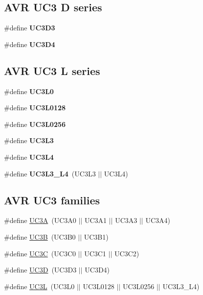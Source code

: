 \subsection*{A\-V\-R U\-C3 D series}
\begin{DoxyCompactItemize}
\item 
\#define {\bfseries U\-C3\-D3}
\item 
\#define {\bfseries U\-C3\-D4}
\end{DoxyCompactItemize}
\subsection*{A\-V\-R U\-C3 L series}
\begin{DoxyCompactItemize}
\item 
\#define {\bfseries U\-C3\-L0}
\item 
\#define {\bfseries U\-C3\-L0128}
\item 
\#define {\bfseries U\-C3\-L0256}
\item 
\#define {\bfseries U\-C3\-L3}
\item 
\#define {\bfseries U\-C3\-L4}
\item 
\hypertarget{group__uc3__part__macros__group_gae4dccd708991a86a5e8598b0c72d6bbd}{\#define {\bfseries U\-C3\-L3\-\_\-\-L4}~(U\-C3\-L3 $|$$|$ U\-C3\-L4)}\label{group__uc3__part__macros__group_gae4dccd708991a86a5e8598b0c72d6bbd}

\end{DoxyCompactItemize}
\subsection*{A\-V\-R U\-C3 families}
\begin{DoxyCompactItemize}
\item 
\#define \hyperlink{group__uc3__part__macros__group_gaf7f16cc2bde7daf34576983fee8824c8}{U\-C3\-A}~(U\-C3\-A0 $|$$|$ U\-C3\-A1 $|$$|$ U\-C3\-A3 $|$$|$ U\-C3\-A4)
\item 
\#define \hyperlink{group__uc3__part__macros__group_ga61e51606324c212eb11079e5acf592e0}{U\-C3\-B}~(U\-C3\-B0 $|$$|$ U\-C3\-B1)
\item 
\#define \hyperlink{group__uc3__part__macros__group_gac7a13b9ceb67804d94b6a8967512ee71}{U\-C3\-C}~(U\-C3\-C0 $|$$|$ U\-C3\-C1 $|$$|$ U\-C3\-C2)
\item 
\#define \hyperlink{group__uc3__part__macros__group_ga351a876f40669641e6ba9620909143d3}{U\-C3\-D}~(U\-C3\-D3 $|$$|$ U\-C3\-D4)
\item 
\#define \hyperlink{group__uc3__part__macros__group_gac8a7d715e500aa74cd05e0f0fc5bb005}{U\-C3\-L}~(U\-C3\-L0 $|$$|$ U\-C3\-L0128 $|$$|$ U\-C3\-L0256 $|$$|$ U\-C3\-L3\-\_\-\-L4)
\end{DoxyCompactItemize}


